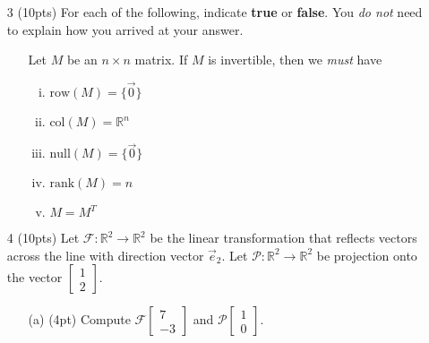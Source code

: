 \documentclass{article}
\newcommand{\R}{\mathbb{R}}
\newcommand{\mat}[1]{\begin{bmatrix}#1\end{bmatrix}}
\begin{document}
\begin{enumerate}
\begin{enumerate}
	
	\end{enumerate}
	\clearpage
	
\item[3 (10pts)] For each of the following, indicate {\bf true} or {\bf false}.  You {\it do not}
	need to explain how you arrived at your answer.
	\begin{enumerate}
		\item[] Let $M$ be an $n\times n$ matrix.  If $M$ is invertible, then we \emph{must} have
			\begin{enumerate}[(i)]
				\item $\mathrm{row}(M)=\{\vec 0\}$
				\vspace{.65in}
				\item $\mathrm{col}(M)=\R^n$
				\vspace{.65in}
				\item $\mathrm{null}(M)=\{\vec 0\}$ 
				\vspace{.65in}
				\item $\mathrm{rank}(M)=n$
				\vspace{.65in}
				\item $M=M^T$ 
			\end{enumerate}
	\end{enumerate}
	\pagebreak


	\item[4 (10pts)] Let $\mathcal F:\R^2\to\R^2$ be the linear transformation that reflects
		vectors across the line with direction vector $\vec e_2$.  
		Let $\mathcal P:\R^2\to\R^2$ be projection
		onto the vector $\mat{1\\2}$.
	\begin{enumerate}
		\item[(a) (4pt)] Compute $\mathcal F\mat{7\\-3}$ and $\mathcal P\mat{1\\0}$.


\end{enumerate}
\end{enumerate}
\end{document}

